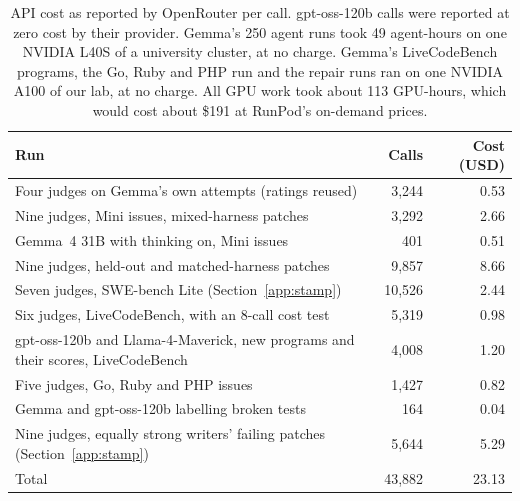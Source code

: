 \documentclass[10pt,letterpaper]{article}
\begin{document}
\begin{table}[H]
\centering
\small
\caption{API cost as reported by OpenRouter per call. gpt-oss-120b calls were reported at zero cost by their
provider. Gemma's 250 agent runs took 49 agent-hours on one NVIDIA L40S of a university cluster, at no charge. Gemma's
LiveCodeBench programs, the Go, Ruby and PHP run and the repair runs ran on one NVIDIA A100 of our lab, at no
charge. All GPU work took about 113 GPU-hours, which would cost about \$191 at RunPod's on-demand prices.}
\begin{tabular}{@{}lrr@{}}
\toprule
Run & Calls & Cost (USD) \\
\midrule
Four judges on Gemma's own attempts (ratings reused) & 3,244 & 0.53 \\
Nine judges, Mini issues, mixed-harness patches & 3,292 & 2.66 \\
Gemma~4 31B with thinking on, Mini issues & 401 & 0.51 \\
Nine judges, held-out and matched-harness patches & 9,857 & 8.66 \\
Seven judges, SWE-bench Lite (Section~\ref{app:stamp}) & 10,526 & 2.44 \\
Six judges, LiveCodeBench, with an 8-call cost test & 5,319 & 0.98 \\
gpt-oss-120b and Llama-4-Maverick, new programs and their scores, LiveCodeBench & 4,008 & 1.20 \\
Five judges, Go, Ruby and PHP issues & 1,427 & 0.82 \\
Gemma and gpt-oss-120b labelling broken tests & 164 & 0.04 \\
Nine judges, equally strong writers' failing patches (Section~\ref{app:stamp}) & 5,644 & 5.29 \\
\midrule
Total & 43,882 & 23.13 \\
\bottomrule
\end{tabular}
\end{table}
\end{document}
